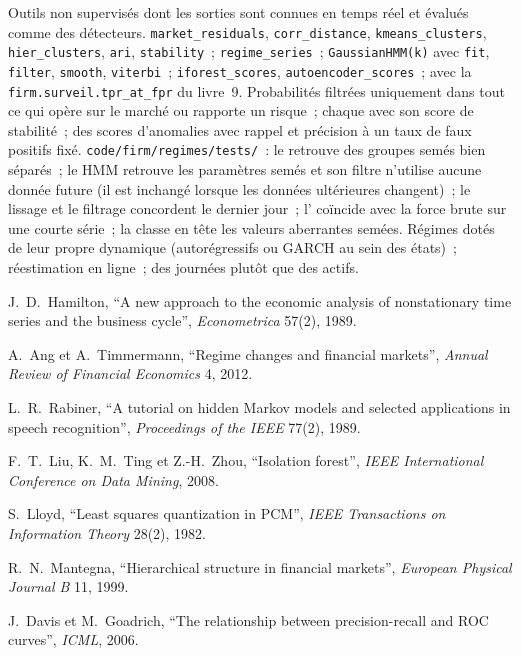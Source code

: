 \begin{build}
 Outils non supervisés dont les sorties sont connues en temps réel et évalués comme des détecteurs.
 \texttt{market\_residuals}, \texttt{corr\_distance}, \texttt{kmeans\_clusters}, \texttt{hier\_clusters},
\texttt{ari}, \texttt{stability}~; \texttt{regime\_series}~; \texttt{GaussianHMM(k)} avec \texttt{fit}, \texttt{filter},
\texttt{smooth}, \texttt{viterbi}~; \texttt{iforest\_scores}, \texttt{autoencoder\_scores}~; avec la
\texttt{firm.surveil.tpr\_at\_fpr} du livre~9.
 Probabilités filtrées uniquement dans tout ce qui opère sur le marché ou rapporte un risque~; chaque  avec son score de stabilité~;
des scores d'anomalies avec rappel et précision à un taux de faux positifs fixé.
 \texttt{code/firm/regimes/tests/}~: le  retrouve des groupes semés bien séparés~; le HMM retrouve les paramètres
semés et son filtre n'utilise aucune donnée future (il est inchangé lorsque les données ultérieures changent)~; le lissage et le filtrage concordent
le dernier jour~; l' coïncide avec la force brute sur une courte série~; la  classe en tête les valeurs aberrantes semées.
 Régimes dotés de leur propre dynamique (autorégressifs ou GARCH au sein des états)~; réestimation en ligne~;  des journées
plutôt que des actifs.
\end{build}

\begin{omsources}
\item J.~D.~Hamilton, ``A new approach to the economic analysis of nonstationary time series and the business cycle'',
\emph{Econometrica} 57(2), 1989.
\item A.~Ang et A.~Timmermann, ``Regime changes and financial markets'', \emph{Annual Review of Financial Economics} 4, 2012.
\item L.~R.~Rabiner, ``A tutorial on hidden Markov models and selected applications in speech recognition'',
\emph{Proceedings of the IEEE} 77(2), 1989.
\item F.~T.~Liu, K.~M.~Ting et Z.-H.~Zhou, ``Isolation forest'', \emph{IEEE International Conference on Data Mining}, 2008.
\item S.~Lloyd, ``Least squares quantization in PCM'', \emph{IEEE Transactions on Information Theory} 28(2), 1982.
\item R.~N.~Mantegna, ``Hierarchical structure in financial markets'', \emph{European Physical Journal B} 11, 1999.
\item J.~Davis et M.~Goadrich, ``The relationship between precision-recall and ROC curves'', \emph{ICML}, 2006.
\end{omsources}


